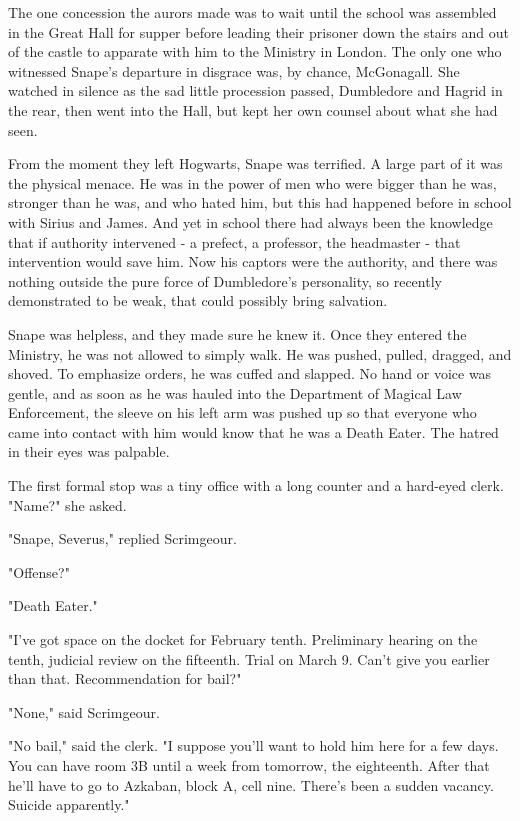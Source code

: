 The one concession the aurors made was to wait until the school was assembled in the Great Hall for supper before leading their prisoner down the stairs and out of the castle to apparate with him to the Ministry in London. The only one who witnessed Snape's departure in disgrace was, by chance, McGonagall. She watched in silence as the sad little procession passed, Dumbledore and Hagrid in the rear, then went into the Hall, but kept her own counsel about what she had seen.

From the moment they left Hogwarts, Snape was terrified. A large part of it was the physical menace. He was in the power of men who were bigger than he was, stronger than he was, and who hated him, but this had happened before in school with Sirius and James. And yet in school there had always been the knowledge that if authority intervened - a prefect, a professor, the headmaster - that intervention would save him. Now his captors were the authority, and there was nothing outside the pure force of Dumbledore's personality, so recently demonstrated to be weak, that could possibly bring salvation.

Snape was helpless, and they made sure he knew it. Once they entered the Ministry, he was not allowed to simply walk. He was pushed, pulled, dragged, and shoved. To emphasize orders, he was cuffed and slapped. No hand or voice was gentle, and as soon as he was hauled into the Department of Magical Law Enforcement, the sleeve on his left arm was pushed up so that everyone who came into contact with him would know that he was a Death Eater. The hatred in their eyes was palpable.

The first formal stop was a tiny office with a long counter and a hard-eyed clerk. "Name?" she asked.

"Snape, Severus," replied Scrimgeour.

"Offense?"

"Death Eater."

"I've got space on the docket for February tenth. Preliminary hearing on the tenth, judicial review on the fifteenth. Trial on March 9. Can't give you earlier than that. Recommendation for bail?"

"None," said Scrimgeour.

"No bail," said the clerk. "I suppose you'll want to hold him here for a few days. You can have room 3B until a week from tomorrow, the eighteenth. After that he'll have to go to Azkaban, block A, cell nine. There's been a sudden vacancy. Suicide apparently."

